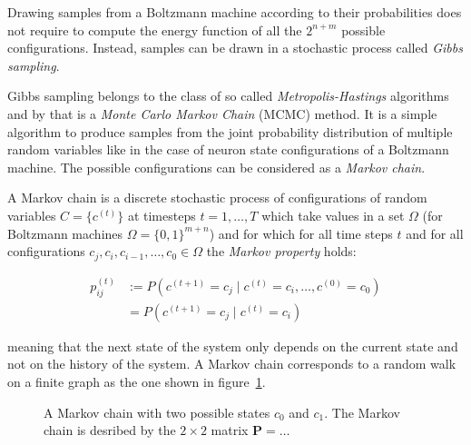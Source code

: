 Drawing samples from a Boltzmann machine according to their probabilities does not require to 
compute the energy function of all the $2^{n+m}$ possible configurations. Instead, samples can be drawn 
in a stochastic process called \textit{Gibbs sampling}.

Gibbs sampling belongs to the class of so called \textit{Metropolis-Hastings} algorithms and by that is 
a \textit{Monte Carlo Markov Chain} (MCMC) method. It is a simple algorithm to produce samples from the 
joint probability distribution of multiple random variables like in the case of neuron state configurations
of a Boltzmann machine. The possible configurations can be considered as a \textit{Markov chain}.

A Markov chain is a discrete stochastic process of configurations of random variables $C=\{c^{(t)}\}$
at timesteps $t=1, \dots, T$ which take values in a set $\Omega$ (for Boltzmann machines 
$\Omega=\{0,1\}^{m+n}$) and for which for all time steps $t$ and for all configurations 
$c_j, c_i, c_{i-1}, \dots, c_0 \in \Omega$ the \textit{Markov property} holds:

\begin{align}
    p_{ij}^{(t)} &:= P(c^{(t+1)} = c_j \mid c^{(t)} = c_i, \dots, c^{(0)} = c_0) \\
                 & = P(c^{(t+1)} = c_j \mid c^{(t)} = c_i) 
\end{align}

meaning that the next state of the system only depends on the current state and not on the 
history of the system. A Markov chain corresponds to a random walk on a finite graph 
as the one shown in figure~\ref{fig:markov}.

\begin{figure}[H]
    \label{fig:markov}
    \centering
    \caption{A Markov chain with two possible states $c_0$ and $c_1$. The Markov chain is 
desribed by the $2 \times 2$ matrix $\bm{P}=\dots$}
\end{figure}

